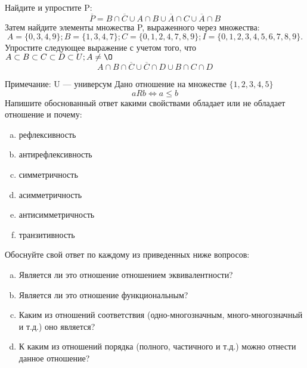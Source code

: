 \documentclass[10pt]{exam}
\begin{document}
\begin{questions}
\question
Найдите и упростите P:
\begin{equation*}
\overline{P} = B \cap \overline{C} \cup A \cap B \cup \overline{A} \cap C \cup \overline{A} \cap B
\end{equation*}
Затем найдите элементы множества P, выраженного через множества:
\begin{equation*}
A = \{0, 3, 4, 9\}; 
B = \{1, 3, 4, 7\};
C = \{0, 1, 2, 4, 7, 8, 9\};
I = \{0, 1, 2, 3, 4, 5, 6, 7, 8, 9\}.
\end{equation*}\question
Упростите следующее выражение с учетом того, что $A\subset B \subset C \subset D \subset U; A \neq \O$
\begin{equation*}
A \cap B  \cap \overline{C} \cup \overline{C} \cap D \cup B \cap C \cap D
\end{equation*}

Примечание: U — универсум\question
Дано отношение на множестве $\{1, 2, 3, 4, 5\}$ 
\begin{equation*}
aRb \iff a \leq b
\end{equation*}
Напишите обоснованный ответ какими свойствами обладает или не обладает отношение и почему:   
\begin{enumerate} [a)]\setcounter{enumi}{0}
\item рефлексивность
\item антирефлексивность
\item симметричность
\item асимметричность
\item антисимметричность
\item транзитивность
\end{enumerate}

Обоснуйте свой ответ по каждому из приведенных ниже вопросов:
\begin{enumerate} [a)]\setcounter{enumi}{0}
    \item Является ли это отношение отношением эквивалентности?
    \item Является ли это отношение функциональным?
    \item Каким из отношений соответствия (одно-многозначным, много-многозначный и т.д.) оно является?
    \item К каким из отношений порядка (полного, частичного и т.д.) можно отнести данное отношение?
\end{enumerate}



\end{questions}
\end{document}
